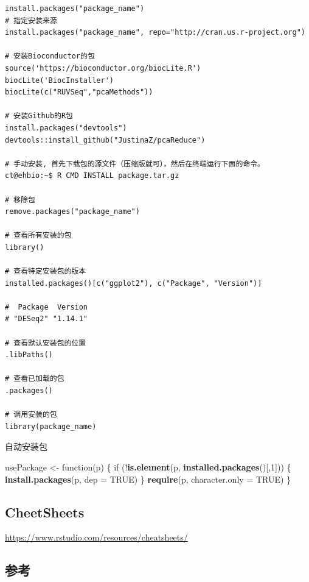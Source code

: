 \documentclass[]{article}
\newenvironment{Shaded}{\begin{snugshade}}{\end{snugshade}}
\newcommand{\KeywordTok}[1]{\textcolor[rgb]{0.13,0.29,0.53}{\textbf{{#1}}}}
\newcommand{\DataTypeTok}[1]{\textcolor[rgb]{0.13,0.29,0.53}{{#1}}}
\newcommand{\DecValTok}[1]{\textcolor[rgb]{0.00,0.00,0.81}{{#1}}}
\newcommand{\StringTok}[1]{\textcolor[rgb]{0.31,0.60,0.02}{{#1}}}
\newcommand{\OtherTok}[1]{\textcolor[rgb]{0.56,0.35,0.01}{{#1}}}
\newcommand{\NormalTok}[1]{{#1}}
\numberwithin{figure}{section}
\numberwithin{table}{section}
\theoremstyle{definition}
\theoremstyle{definition}
\theoremstyle{definition}
\theoremstyle{remark}
\begin{document}
\begin{verbatim}
install.packages("package_name")
# 指定安装来源
install.packages("package_name", repo="http://cran.us.r-project.org")

# 安装Bioconductor的包
source('https://bioconductor.org/biocLite.R')
biocLite('BiocInstaller')
biocLite(c("RUVSeq","pcaMethods"))

# 安装Github的R包
install.packages("devtools")
devtools::install_github("JustinaZ/pcaReduce")

# 手动安装, 首先下载包的源文件（压缩版就可），然后在终端运行下面的命令。
ct@ehbio:~$ R CMD INSTALL package.tar.gz

# 移除包
remove.packages("package_name")

# 查看所有安装的包
library()

# 查看特定安装包的版本
installed.packages()[c("ggplot2"), c("Package", "Version")]

#  Package  Version 
# "DESeq2" "1.14.1" 

# 查看默认安装包的位置
.libPaths()

# 查看已加载的包
.packages()

# 调用安装的包
library(package_name)
\end{verbatim}

自动安装包

\begin{Shaded}
\begin{Highlighting}[]
\NormalTok{usePackage <-}\StringTok{ }\NormalTok{function(p) \{}
    \NormalTok{if (!}\KeywordTok{is.element}\NormalTok{(p, }\KeywordTok{installed.packages}\NormalTok{()[,}\DecValTok{1}\NormalTok{])) \{}
        \KeywordTok{install.packages}\NormalTok{(p, }\DataTypeTok{dep =} \OtherTok{TRUE}\NormalTok{)}
    \NormalTok{\}}
    \KeywordTok{require}\NormalTok{(p, }\DataTypeTok{character.only =} \OtherTok{TRUE}\NormalTok{)}
\NormalTok{\}}
\end{Highlighting}
\end{Shaded}

\subsection{CheetSheets}\label{cheetsheets}

\url{https://www.rstudio.com/resources/cheatsheets/}

\subsection{参考}
\end{document}
